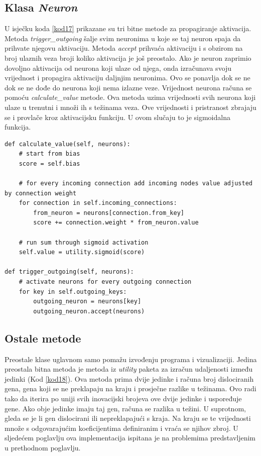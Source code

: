 \documentclass[times, utf8, diplomski, numeric]{fer}
\begin{document}
\subsection{Klasa \textit{Neuron}}
U isječku koda \ref{kod17} prikazane su tri bitne metode za propagiranje aktivacija. Metoda \textit{trigger\_outgoing} šalje svim neuronima u koje se taj neuron spaja da prihvate njegovu aktivaciju. Metoda \textit{accept} prihvaća aktivaciju i s obzirom na broj ulaznih veza broji koliko aktivacija je još preostalo. Ako je neuron zaprimio dovoljno aktivacija od neurona koji ulaze od njega, onda izračunava svoju vrijednost i propagira aktivaciju daljnjim neuronima. Ovo se ponavlja dok se ne dok se ne dođe do neurona koji nema izlazne veze. Vrijednost neurona računa se pomoću \textit{calculate\_value} metode. Ova metoda uzima vrijednosti svih neurona koji ulaze u trenutni i množi ih s težinama veza. Ove vrijednosti i pristranost zbrajaju se i provlače kroz aktivacijsku funkciju. U ovom slučaju to je sigmoidalna funkcija.

\begin{lstlisting}[frame=single, label=kod17, caption=Metode bitne za propagiranje aktivacija neurona u klasi \textit{Neuron}]
def calculate_value(self, neurons):
	# start from bias
	score = self.bias

	# for every incoming connection add incoming nodes value adjusted by connection weight
	for connection in self.incoming_connections:
		from_neuron = neurons[connection.from_key]
		score += connection.weight * from_neuron.value

	# run sum through sigmoid activation
	self.value = utility.sigmoid(score)

def trigger_outgoing(self, neurons):
	# activate neurons for every outgoing connection
	for key in self.outgoing_keys:
		outgoing_neuron = neurons[key]
		outgoing_neuron.accept(neurons)
\end{lstlisting}

\subsection{Ostale metode}
Preostale klase uglavnom samo pomažu izvođenju programa i vizualizaciji. Jedina preostala bitna metoda je metoda iz \textit{utility} paketa za izračun udaljenosti između jedinki (Kod \ref{kod18}). Ova metoda prima dvije jedinke i računa broj dislociranih gena, gena koji se ne preklapaju na kraju i prosječne razlike u težinama. Ovo radi tako da iterira po uniji svih inovacijski brojeva ove dvije jedinke i uspoređuje gene. Ako obje jedinke imaju taj gen, računa se razlika u težini. U suprotnom, gleda se je li gen dislocirani ili nepreklapajući s kraja. Na kraju se te vrijednosti množe s odgovarajućim koeficijentima definiranim i vraća se njihov zbroj. U sljedećem poglavlju ova implementacija ispitana je na problemima predstavljenim u prethodnom poglavlju.
\end{document}

